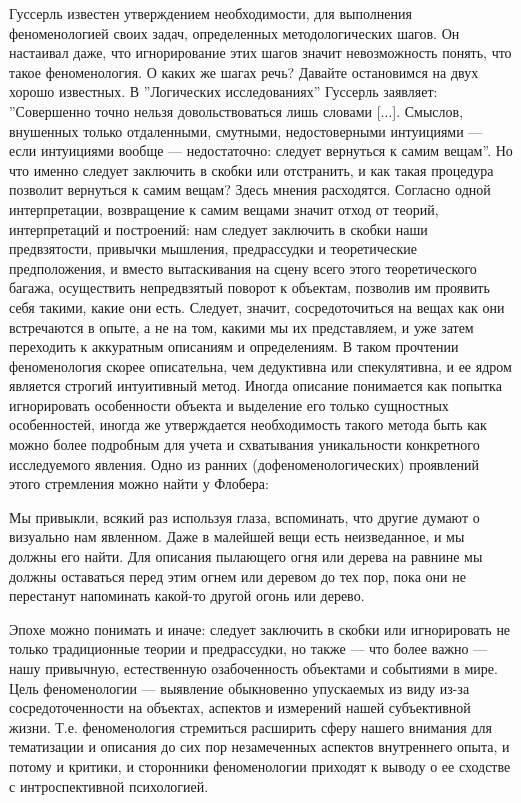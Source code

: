 \documentclass[11pt]{book}
\begin{document}
Гуссерль известен утверждением необходимости, для выполнения феноменологией своих задач, определенных методологических шагов. Он настаивал даже, что игнорирование этих шагов значит невозможность понять, что такое феноменология. О каких же шагах речь? Давайте остановимся на двух хорошо известных. В ''Логических исследованиях'' Гуссерль заявляет: ''Совершенно точно нельзя довольствоваться лишь словами [...]. Смыслов, внушенных только отдаленными, смутными, недостоверными интуициями --- если интуициями вообще --- недостаточно: следует вернуться к самим вещам''. Но что именно следует заключить в скобки или отстранить, и как такая процедура позволит вернуться к самим вещам? Здесь мнения расходятся. Согласно одной интерпретации, возвращение к самим вещами значит отход от теорий, интерпретаций и построений: нам следует заключить в скобки наши предвзятости, привычки мышления, предрассудки и теоретические предположения, и вместо вытаскивания на сцену всего этого теоретического багажа, осуществить непредвзятый поворот к объектам, позволив им проявить себя такими, какие они есть. Следует, значит, сосредоточиться на вещах как они встречаются в опыте, а не на том, какими мы их представляем, и уже затем переходить к аккуратным описаниям и определениям. В таком прочтении феноменология скорее описательна, чем дедуктивна или спекулятивна, и ее ядром является строгий интуитивный метод. Иногда описание понимается как попытка игнорировать особенности объекта и выделение его только сущностных особенностей, иногда же утверждается необходимость такого метода быть как можно более подробным для учета и схватывания уникальности конкретного исследуемого явления. Одно из ранних (дофеноменологических) проявлений этого стремления можно найти у Флобера:

\smallskip
{}\relax
{}\relax

Мы привыкли, всякий раз используя глаза, вспоминать, что другие думают о визуально нам явленном. Даже в малейшей вещи есть неизведанное, и мы должны его найти. Для описания пылающего огня или дерева на равнине мы должны оставаться перед этим огнем или деревом до тех пор, пока они не перестанут напоминать какой-то другой огонь или дерево.

\relax
{}\relax
\smallskip

Эпохе можно понимать и иначе: следует заключить в скобки или игнорировать не только традиционные теории и предрассудки, но также --- что более важно --- нашу привычную, естественную озабоченность объектами и событиями в мире. Цель феноменологии --- выявление обыкновенно упускаемых из виду из-за сосредоточенности на объектах, аспектов и измерений нашей субъективной жизни. Т.е. феноменология стремиться расширить сферу нашего внимания для тематизации и описания до сих пор незамеченных аспектов внутреннего опыта, и потому и критики, и сторонники феноменологии приходят к выводу о ее сходстве с интроспективной психологией.
\end{document}
